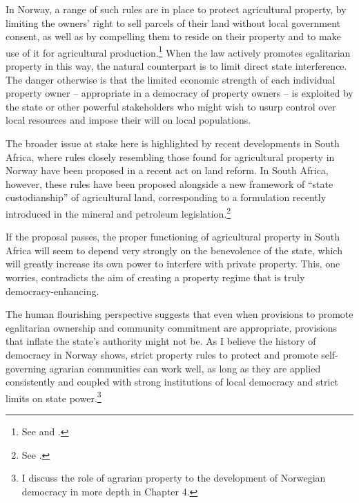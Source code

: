 In Norway, a range of such rules are in place to protect agricultural property, by limiting the owners' right to sell parcels of their land without local government consent, as well as by compelling them to reside on their property and to make use of it for agricultural production.\footnote{See \cite[8|12]{la95} and \cite[4|5]{lca03}.} When the law actively promotes egalitarian property in this way, the natural counterpart is to limit direct state interference. The danger otherwise is that the limited economic strength of each individual property owner -- appropriate in a democracy of property owners -- is exploited by the state or other powerful stakeholders who might wish to usurp control over local resources and impose their will on local populations.

The broader issue at stake here is highlighted by recent developments in South Africa, where  rules closely resembling those found for agricultural property in Norway have been proposed in a recent act on land reform. In South Africa, however, these rules have been proposed alongside a new framework of ``state custodianship'' of agricultural land, corresponding to a formulation recently introduced in the mineral and petroleum legislation.\footnote{See \cite{steyn15}.}

If the proposal passes, the proper functioning of agricultural property in South Africa will seem to depend very strongly on the benevolence of the state, which will greatly increase its own power to interfere with private property. This, one worries, contradicts the aim of creating a property regime that is truly democracy-enhancing.

The human flourishing perspective suggests that even when provisions to promote egalitarian ownership and community commitment are appropriate, provisions that inflate the state's authority might not be. As I believe the history of democracy in Norway shows, strict property rules to protect and promote self-governing agrarian communities can work well, as long as they are applied consistently and coupled with strong institutions of local democracy and strict limits on state power.\footnote{I discuss the role of agrarian property to the development of Norwegian democracy in more depth in Chapter 4.}

